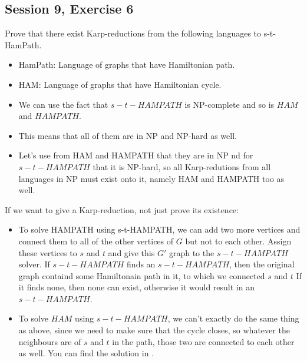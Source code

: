 \subsection {Session 9, Exercise 6}


Prove that there exist Karp-reductions from the following languages to s-t-HamPath.
\begin{itemize}
    \item HamPath: Language of graphs that have Hamiltonian path.
    \item HAM: Language of graphs that have Hamiltonian cycle.
\end{itemize}

\begin{itemize}
    \item We can use the fact that $s-t-HAMPATH$ is NP-complete and so is $HAM$ and $HAMPATH$.
    \item This means that all of them are in NP and NP-hard as well.
    \item Let's use from HAM and HAMPATH that they are in NP nd for $s-t-HAMPATH$ that it is NP-hard, so all Karp-redutions from all languages in NP must exist onto it, namely HAM and HAMPATH too as well.
\end{itemize}

If we want to give a Karp-reduction, not just prove its existence:

\begin{itemize}
    \item To solve HAMPATH using s-t-HAMPATH, we can add two more vertices and connect them to all of the other vertices of $G$ but not to each other. Assign these vertices to $s$ and $t$ and give this $G'$ graph to the $s-t-HAMPATH$ solver. If $s-t-HAMPATH$ finds an $s-t-HAMPATH$, then the original graph containd some Hamiltonain path in it, to which we connected $s$ and $t$ If it finds none, then none can exist, otherwise it would result in an $s-t-HAMPATH$.
    \item To solve $HAM$ using $s-t-HAMPATH$, we can't exactly do the same thing as above, since we need to make sure that the cycle closes, so whatever the neighbours are of $s$ and $t$ in the path, those two are connected to each other as well. You can find the solution in .
\end{itemize}